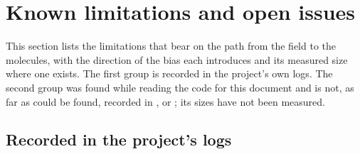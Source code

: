 \section{Known limitations and open issues}
\label{sec:limitations}

This section lists the limitations that bear on the path from the field to
the molecules, with the direction of the bias each introduces and its
measured size where one exists. The first group is recorded in the project's
own logs. The second group was found while reading the code for this document
and is not, as far as could be found, recorded in ,
 or ; its sizes have not been
measured.

\subsection{Recorded in the project's logs}

